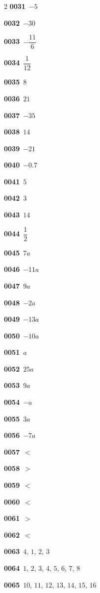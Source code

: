 \documentclass[10pt,a4paper]{article}
\begin{document}
\begin{multicols}{2}
\noindent\textbf{0031}\ $-5$\par
\noindent\textbf{0032}\ $-30$\par
\noindent\textbf{0033}\ $-\dfrac{11}{6}$\par
\noindent\textbf{0034}\ $\dfrac{1}{12}$\par
\noindent\textbf{0035}\ $8$\par
\noindent\textbf{0036}\ $21$\par
\noindent\textbf{0037}\ $-35$\par
\noindent\textbf{0038}\ $14$\par
\noindent\textbf{0039}\ $-21$\par
\noindent\textbf{0040}\ $-0.7$\par
\noindent\textbf{0041}\ $5$\par
\noindent\textbf{0042}\ $3$\par
\noindent\textbf{0043}\ $14$\par
\noindent\textbf{0044}\ $\dfrac{1}{2}$\par
\noindent\textbf{0045}\ $7a$\par
\noindent\textbf{0046}\ $-11a$\par
\noindent\textbf{0047}\ $9a$\par
\noindent\textbf{0048}\ $-2a$\par
\noindent\textbf{0049}\ $-13a$\par
\noindent\textbf{0050}\ $-10a$\par
\noindent\textbf{0051}\ $a$\par
\noindent\textbf{0052}\ $25a$\par
\noindent\textbf{0053}\ $9a$\par
\noindent\textbf{0054}\ $-a$\par
\noindent\textbf{0055}\ $3a$\par
\noindent\textbf{0056}\ $-7a$\par
\noindent\textbf{0057}\ $<$\par
\noindent\textbf{0058}\ $>$\par
\noindent\textbf{0059}\ $<$\par
\noindent\textbf{0060}\ $<$\par
\noindent\textbf{0061}\ $>$\par
\noindent\textbf{0062}\ $<$\par
\noindent\textbf{0063}\ $4$, $1$, $2$, $3$\par
\noindent\textbf{0064}\ $1$, $2$, $3$, $4$, $5$, $6$, $7$, $8$\par
\noindent\textbf{0065}\ $10$, $11$, $12$, $13$, $14$, $15$, $16$\par

\end{multicols}
\end{document}
